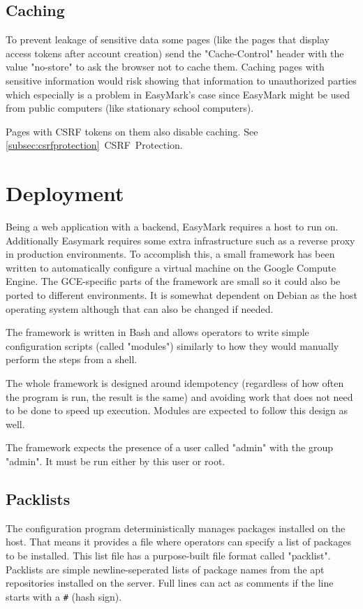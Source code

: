\documentclass[12pt,a4paper,oneside]{report}
\begin{document}
	\subsection{Caching}
	To prevent leakage of sensitive data some pages (like the pages that display access tokens after account creation) send the "Cache-Control" header with the value "no-store" to ask the browser not to cache them. Caching pages with sensitive information would risk showing that information to unauthorized parties which especially is a problem in EasyMark's case since EasyMark might be used from public computers (like stationary school computers).

	Pages with CSRF tokens on them also disable caching. See \ref{subsec:csrfprotection}~CSRF~Protection.

	\section{Deployment}
	Being a web application with a backend, EasyMark requires a host to run on. Additionally Easymark requires some extra infrastructure such as a reverse proxy in production environments. To accomplish this, a small framework has been written to automatically configure a virtual machine on the Google Compute Engine. The GCE-specific parts of the framework are small so it could also be ported to different environments. It is somewhat dependent on Debian as the host operating system although that can also be changed if needed.

	The framework is written in Bash and allows operators to write simple configuration scripts (called "modules") similarly to how they would manually perform the steps from a shell.

	The whole framework is designed around idempotency (regardless of how often the program is run, the result is the same) and avoiding work that does not need to be done to speed up execution. Modules are expected to follow this design as well.

	The framework expects the presence of a user called "admin" with the group "admin". It must be run either by this user or root.

	\subsection{Packlists}
	The configuration program deterministically manages packages installed on the host. That means it provides a file where operators can specify a list of packages to be installed. This list file has a purpose-built file format called "packlist". Packlists are simple newline-seperated lists of package names from the apt repositories installed on the server. Full lines can act as comments if the line starts with a \lstinline|#| (hash sign).
\end{document}
